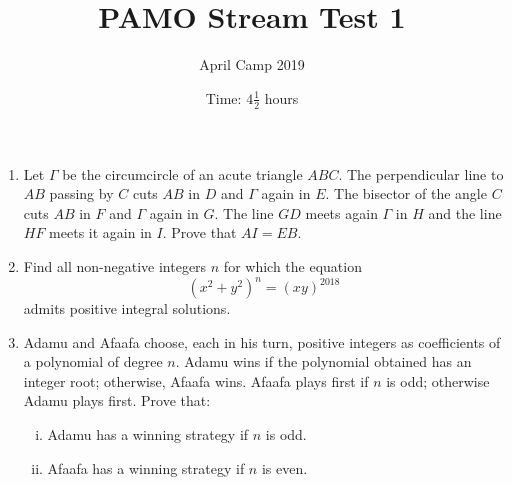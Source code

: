 \documentclass[a4paper, 12pt]{article}
\title{PAMO Stream Test 1}
\author{April Camp 2019}
\date{Time: $4 \frac{1}{2}$ hours}
\begin{document}
 \maketitle

\begin{enumerate}

\item Let $\Gamma$ be the circumcircle of an acute triangle $ABC$. The perpendicular line to $AB$ passing by $C$ cuts $AB$ in $D$ and $\Gamma$ again in $E$. The bisector of the angle $C$ cuts $AB$ in $F$ and $\Gamma$ again in $G$. The line $GD$ meets again $\Gamma$ in $H$ and the line $HF$ meets it again in $I$. Prove that $AI = EB$.


\item Find all non-negative integers $n$ for which the equation
\[
    {\left( x^2 + y^2 \right)}^n = {(xy)}^{2018}
\]
admits positive integral solutions.


\item Adamu and Afaafa choose, each in his turn, positive integers as coefficients of a polynomial of degree $n$. Adamu wins if the polynomial obtained has an integer root; otherwise, Afaafa wins. Afaafa plays first if $n$ is odd; otherwise Adamu plays first. Prove that:
\begin{enumerate}[i)]

\item Adamu has a winning strategy if $n$ is odd.

\item Afaafa has a winning strategy if $n$ is even.

\end{enumerate}


\end{enumerate}

\vfill

\centering

\vspace{12mm}
\end{document}
